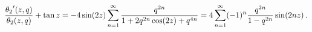\[\frac{\mathop{\theta_{2}\/}\nolimits'\!\left(z,q\right)}{\mathop{\theta_{2}\/}%
\nolimits\!\left(z,q\right)}+\mathop{\tan\/}\nolimits z=-4\mathop{\sin\/}%
\nolimits\!\left(2z\right)\sum_{n=1}^{\infty}\frac{q^{2n}}{1+2q^{2n}\mathop{%
\cos\/}\nolimits\!\left(2z\right)+q^{4n}}=4\sum_{n=1}^{\infty}(-1)^{n}\frac{q^%
{2n}}{1-q^{2n}}\mathop{\sin\/}\nolimits\!\left(2nz\right).\]